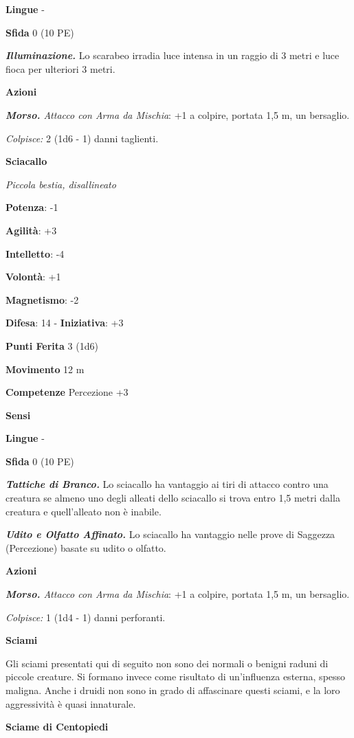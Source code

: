 \begin{multicols}{2}
\textbf{Lingue} -

\textbf{Sfida} 0 (10 PE)

\emph{\textbf{Illuminazione.}} Lo scarabeo irradia luce intensa in un
raggio di 3 metri e luce fioca per ulteriori 3 metri.

\textbf{Azioni}

\emph{\textbf{Morso.} Attacco con Arma da Mischia}: +1 a colpire,
portata 1,5 m, un bersaglio.

\emph{Colpisce:} 2 (1d6 - 1) danni taglienti.

\textbf{Sciacallo}

\emph{Piccola bestia, disallineato}

\textbf{Potenza}: -1

\textbf{Agilità}: +3

\textbf{Intelletto}: -4

\textbf{Volontà}: +1

\textbf{Magnetismo}: -2

\textbf{Difesa}: 14 - \textbf{Iniziativa}: +3

\textbf{Punti Ferita} 3 (1d6)

\textbf{Movimento} 12 m

\textbf{Competenze} Percezione +3

\textbf{Sensi} 

\textbf{Lingue} -

\textbf{Sfida} 0 (10 PE)

\emph{\textbf{Tattiche di Branco.}} Lo sciacallo ha vantaggio ai tiri di
attacco contro una creatura se almeno uno degli alleati dello sciacallo
si trova entro 1,5 metri dalla creatura e quell'alleato non è inabile.

\emph{\textbf{Udito e Olfatto Affinato.}} Lo sciacallo ha vantaggio
nelle prove di Saggezza (Percezione) basate su udito o olfatto.

\textbf{Azioni}

\emph{\textbf{Morso.} Attacco con Arma da Mischia}: +1 a colpire,
portata 1,5 m, un bersaglio.

\emph{Colpisce:} 1 (1d4 - 1) danni perforanti.

\textbf{Sciami}

Gli sciami presentati qui di seguito non sono dei normali o benigni
raduni di piccole creature. Si formano invece come risultato di
un'influenza esterna, spesso maligna. Anche i druidi non sono in grado
di affascinare questi sciami, e la loro aggressività è quasi innaturale.

\textbf{Sciame di Centopiedi}


\end{multicols}
